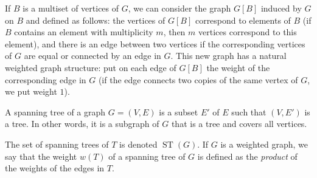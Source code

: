 \documentclass[envcountsame]{svmult}
\def\WDep{G}
\DeclareMathOperator{\ST}{ST}
\begin{document}
If $B$ is a multiset of vertices of $\WDep$,
we can consider the graph $\WDep[B]$ induced by $\WDep$ on $B$ and defined as follows:
the vertices of $\WDep[B]$ correspond to elements of $B$ (if $B$ contains an element with multiplicity $m$,
then $m$ vertices correspond to this element),
and there is an edge between two vertices if the corresponding vertices of $\WDep$ are equal 
or connected by an edge in $\WDep$. This new graph  has a natural weighted graph structure:
put on each edge of $\WDep[B]$ the weight of the corresponding edge in $\WDep$
(if the edge connects two copies of the same vertex of $\WDep$,
we put weight $1$).

\begin{definition}
A spanning tree of a graph $\WDep=(V,E)$ is
a subset $E'$ of $E$ such that $(V,E')$ is a tree.
In other words, it is a subgraph of $\WDep$ that is a tree
and covers all vertices.
\end{definition}
The set of spanning trees of $T$ is denoted $\ST(\WDep)$. If $\WDep$ is a weighted graph, 
we say that the weight $w(T)$ of a spanning tree of $\WDep$
is defined as the {\em product} of the weights of the edges in $T$.
\end{document}
